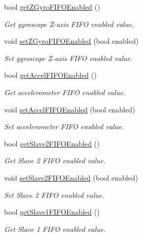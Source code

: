 \begin{DoxyCompactItemize}
bool \mbox{\hyperlink{classMPU6050_adbbbd131c74f37dd545403633eb317ff}{get\+Z\+Gyro\+F\+I\+F\+O\+Enabled}} ()
\begin{DoxyCompactList}\small\item\em Get gyroscope Z-\/axis F\+I\+FO enabled value. \end{DoxyCompactList}\item 
void \mbox{\hyperlink{classMPU6050_af5b5bc39b66466ba910f6eef1259444c}{set\+Z\+Gyro\+F\+I\+F\+O\+Enabled}} (bool enabled)
\begin{DoxyCompactList}\small\item\em Set gyroscope Z-\/axis F\+I\+FO enabled value. \end{DoxyCompactList}\item 
bool \mbox{\hyperlink{classMPU6050_ace244415128ad7a38293ad6808b7face}{get\+Accel\+F\+I\+F\+O\+Enabled}} ()
\begin{DoxyCompactList}\small\item\em Get accelerometer F\+I\+FO enabled value. \end{DoxyCompactList}\item 
void \mbox{\hyperlink{classMPU6050_afccbee85f5cdc95098f6d62d8d417c3f}{set\+Accel\+F\+I\+F\+O\+Enabled}} (bool enabled)
\begin{DoxyCompactList}\small\item\em Set accelerometer F\+I\+FO enabled value. \end{DoxyCompactList}\item 
bool \mbox{\hyperlink{classMPU6050_a3c2e29508607a655221a2fa4f4219b4d}{get\+Slave2\+F\+I\+F\+O\+Enabled}} ()
\begin{DoxyCompactList}\small\item\em Get Slave 2 F\+I\+FO enabled value. \end{DoxyCompactList}\item 
void \mbox{\hyperlink{classMPU6050_a38a10ac4f30b96718ec021dc0db8587b}{set\+Slave2\+F\+I\+F\+O\+Enabled}} (bool enabled)
\begin{DoxyCompactList}\small\item\em Set Slave 2 F\+I\+FO enabled value. \end{DoxyCompactList}\item 
bool \mbox{\hyperlink{classMPU6050_afd6a9b55a589c83c9a0fb0b5b2a88234}{get\+Slave1\+F\+I\+F\+O\+Enabled}} ()
\begin{DoxyCompactList}\small\item\em Get Slave 1 F\+I\+FO enabled value. \end{DoxyCompactList}\item 

\end{DoxyCompactItemize}
